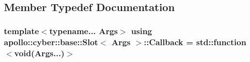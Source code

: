 \subsection{Member Typedef Documentation}
\hypertarget{classapollo_1_1cyber_1_1base_1_1Slot_a48f31ca5e36bfedb3f0e91ef69bb4fe8}{
\subsubsection[{Callback}]{\setlength{\rightskip}{0pt plus 5cm}template$<$typename... Args$>$ using {\bf apollo\-::cyber\-::base\-::\-Slot}$<$ Args $>$\-::{\bf Callback} =  std\-::function$<$void(Args...)$>$}}\label{classapollo_1_1cyber_1_1base_1_1Slot_a48f31ca5e36bfedb3f0e91ef69bb4fe8}


